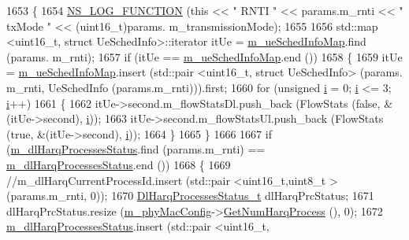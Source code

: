 \begin{DoxyCode}
1653 \{
1654   \hyperlink{log-macros-disabled_8h_a90b90d5bad1f39cb1b64923ea94c0761}{NS\_LOG\_FUNCTION} (\textcolor{keyword}{this} << \textcolor{stringliteral}{" RNTI "} << params.m\_rnti << \textcolor{stringliteral}{" txMode "} << (uint16\_t)params.
      m\_transmissionMode);
1655 
1656   std::map <uint16\_t, struct UeSchedInfo>::iterator itUe = \hyperlink{classns3_1_1MmWaveFlexTtiPfMacScheduler_a3b6dd19d8156d24c8d30cc562843b740}{m\_ueSchedInfoMap}.find (params.
      m\_rnti);
1657   \textcolor{keywordflow}{if} (itUe == \hyperlink{classns3_1_1MmWaveFlexTtiPfMacScheduler_a3b6dd19d8156d24c8d30cc562843b740}{m\_ueSchedInfoMap}.end ())
1658   \{
1659         itUe = \hyperlink{classns3_1_1MmWaveFlexTtiPfMacScheduler_a3b6dd19d8156d24c8d30cc562843b740}{m\_ueSchedInfoMap}.insert (std::pair <uint16\_t, struct UeSchedInfo> (params.
      m\_rnti, UeSchedInfo (params.m\_rnti))).first;
1660         \textcolor{keywordflow}{for} (\textcolor{keywordtype}{unsigned} \hyperlink{bernuolliDistribution_8m_a6f6ccfcf58b31cb6412107d9d5281426}{i} = 0; \hyperlink{bernuolliDistribution_8m_a6f6ccfcf58b31cb6412107d9d5281426}{i} <= 3; \hyperlink{bernuolliDistribution_8m_a6f6ccfcf58b31cb6412107d9d5281426}{i}++)
1661         \{
1662                 itUe->second.m\_flowStatsDl.push\_back (FlowStats (\textcolor{keyword}{false}, &(itUe->second), 
      \hyperlink{bernuolliDistribution_8m_a6f6ccfcf58b31cb6412107d9d5281426}{i}));
1663                 itUe->second.m\_flowStatsUl.push\_back (FlowStats (\textcolor{keyword}{true}, &(itUe->second), 
      \hyperlink{bernuolliDistribution_8m_a6f6ccfcf58b31cb6412107d9d5281426}{i}));
1664         \}
1665   \}
1666 
1667   \textcolor{keywordflow}{if} (\hyperlink{classns3_1_1MmWaveFlexTtiPfMacScheduler_ac8fbe1bcc35d738ae7944797590909fc}{m\_dlHarqProcessesStatus}.find (params.m\_rnti) == 
      \hyperlink{classns3_1_1MmWaveFlexTtiPfMacScheduler_ac8fbe1bcc35d738ae7944797590909fc}{m\_dlHarqProcessesStatus}.end ())
1668   \{
1669         \textcolor{comment}{//m\_dlHarqCurrentProcessId.insert (std::pair <uint16\_t,uint8\_t > (params.m\_rnti, 0));}
1670         \hyperlink{classns3_1_1MmWaveFlexTtiPfMacScheduler_a75e349f797625294b5bb7cb4d124c3c9}{DlHarqProcessesStatus\_t} dlHarqPrcStatus;
1671         dlHarqPrcStatus.resize (\hyperlink{classns3_1_1MmWaveMacScheduler_a24d7af4971d2e500fe543cefbafa2fd9}{m\_phyMacConfig}->\hyperlink{classns3_1_1MmWavePhyMacCommon_a40773d84172ebeb5aff125f56ebcc5ac}{GetNumHarqProcess} (), 0);
1672         \hyperlink{classns3_1_1MmWaveFlexTtiPfMacScheduler_ac8fbe1bcc35d738ae7944797590909fc}{m\_dlHarqProcessesStatus}.insert (std::pair <uint16\_t,

\end{DoxyCode}
